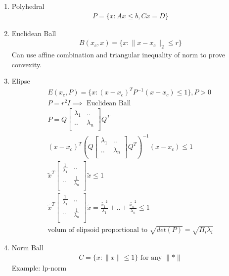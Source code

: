 \documentclass[12pt,letter]{article}
\newcommand{\norm}[1]{\|#1\|}
\begin{document}

\begin{enumerate}
\item Polyhedral
  \begin{align*}
    P=\{x: Ax \leq b, Cx=D \}
  \end{align*}

\item Euclidean Ball
  \begin{align*}
    B(x_c,x) = \{ x: \norm{x-x_c}_2 \leq r \}
  \end{align*}
  Can use affine combination and triangular inequality of norm to prove convexity.
\item Elipse
  \begin{align*}
    E(x_c,P) = \{ x: (x-x_c)^T P^{-1} (x-x_c) \leq 1 \}, P > 0\\
    P=r^2 I \implies \text{ Euclidean Ball }\\
    P=Q \begin{bmatrix}
      \lambda_1 & ..\\
      .. & \lambda_n\\
    \end{bmatrix}
    Q^T\\
    (x-x_c)^T (Q \begin{bmatrix}
      \lambda_1 & ..\\
      .. & \lambda_n\\
    \end{bmatrix}
    Q^T)^{-1}(x-x_c) \leq 1\\
    \tilde{x}^T \begin{bmatrix}
      \frac{1}{\lambda_1} & ..\\
      .. & \frac{1}{\lambda_n}\\
    \end{bmatrix}
    \tilde{x} \leq 1\\
    \tilde{x}^T \begin{bmatrix}
      \frac{1}{\lambda_1} & ..\\
      .. & \frac{1}{\lambda_n}\\
    \end{bmatrix}
    \tilde{x} = \frac{\tilde{x_1}^2}{\lambda_1}+..+\frac{\tilde{x_n}^2}{\lambda_n}\leq 1\\
    \text{volum of elipsoid proportional to } \sqrt{det(P)}=\sqrt{\Pi_i \lambda_i}
  \end{align*}
  \item Norm Ball
  \begin{align*}
    C=\{x: \norm{x} \leq 1 \} \text{ for any } \norm{*}
  \end{align*}
  Example: lp-norm\\
  

\end{enumerate}
\end{document}
